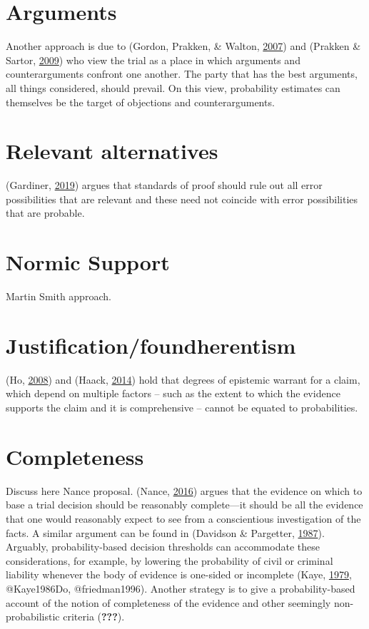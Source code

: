 \documentclass[]{book}
\begin{document}
\section{Arguments}

Another approach is due to (Gordon, Prakken, \& Walton, \protect\hyperlink{ref-gordon2007}{2007}) and (Prakken \& Sartor, \protect\hyperlink{ref-prakken2009}{2009}) who view the trial as a place in which arguments and counterarguments confront one another. The party that has the best arguments, all things considered, should prevail. On this view, probability estimates can themselves be the target of objections and counterarguments.

\section{Relevant alternatives}

(Gardiner, \protect\hyperlink{ref-gardiner2019ppa}{2019}) argues that standards of proof should rule out all error possibilities that are relevant and these need not coincide with error possibilities that are probable.

\section{Normic Support}

Martin Smith approach.

\section{Justification/foundherentism}

(Ho, \protect\hyperlink{ref-ho2008philosophy}{2008}) and (Haack, \protect\hyperlink{ref-Haack2014-HAAEMS}{2014})
hold that degrees of epistemic warrant for a claim, which depend
on multiple factors -- such as the extent to which the evidence
supports the claim and it is comprehensive -- cannot be equated
to probabilities.

\section{Completeness}

Discuss here Nance proposal. (Nance, \protect\hyperlink{ref-nance2016}{2016}) argues that the evidence on which to base a trial decision should be reasonably complete---it should be all the evidence that one would reasonably expect to see from a conscientious investigation of the facts. A similar argument can be found in (Davidson \& Pargetter, \protect\hyperlink{ref-davidsonpargetter1987}{1987}). Arguably, probability-based decision thresholds can accommodate these considerations, for example, by lowering the probability of civil or criminal liability whenever the body of evidence is one-sided or incomplete (Kaye, \protect\hyperlink{ref-Kaye79gate}{1979}, @Kaye1986Do, @friedman1996). Another strategy is to give a probability-based account of the notion of completeness of the evidence and other seemingly non-probabilistic criteria ({\textbf{???}}).
\end{document}
